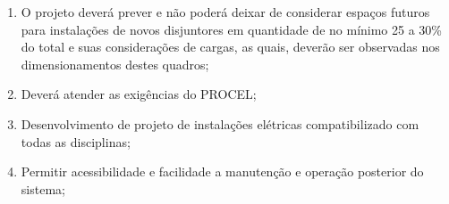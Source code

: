 \begin{enumerate}
	\item O projeto deverá prever e não poderá deixar de considerar espaços futuros para instalações de novos disjuntores em quantidade de no mínimo 25 a 30\% do total e suas considerações de cargas, as quais, deverão ser observadas nos dimensionamentos destes quadros; 
	
	\item Deverá atender as exigências do PROCEL;
	
	\item Desenvolvimento de projeto de instalações elétricas compatibilizado com todas as disciplinas;
	
	\item Permitir acessibilidade e facilidade a manutenção e operação posterior do sistema;
\end{enumerate}